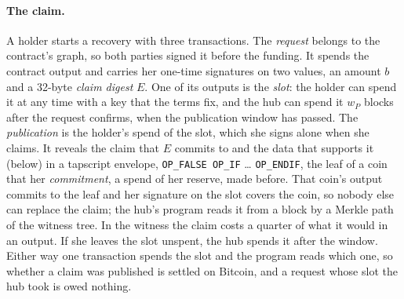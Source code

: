 \documentclass[11pt]{article}
\newcommand{\wP}{w_P}
\begin{document}
\paragraph{The claim.} A holder starts a recovery with three transactions. The \emph{request} belongs to the contract's graph, so both parties signed it before the funding. It spends the contract output and carries her one-time signatures on two values, an amount $b$ and a 32-byte \emph{claim digest} $E$. One of its outputs is the \emph{slot}: the holder can spend it at any time with a key that the terms fix, and the hub can spend it $\wP$ blocks after the request confirms, when the publication window has passed. The \emph{publication} is the holder's spend of the slot, which she signs alone when she claims. It reveals the claim that $E$ commits to and the data that supports it (below) in a tapscript envelope, \texttt{OP\_FALSE OP\_IF} \ldots{} \texttt{OP\_ENDIF}, the leaf of a coin that her \emph{commitment}, a spend of her reserve, made before. That coin's output commits to the leaf and her signature on the slot covers the coin, so nobody else can replace the claim; the hub's program reads it from a block by a Merkle path of the witness tree. In the witness the claim costs a quarter of what it would in an output. If she leaves the slot unspent, the hub spends it after the window. Either way one transaction spends the slot and the program reads which one, so whether a claim was published is settled on Bitcoin, and a request whose slot the hub took is owed nothing.
\end{document}

